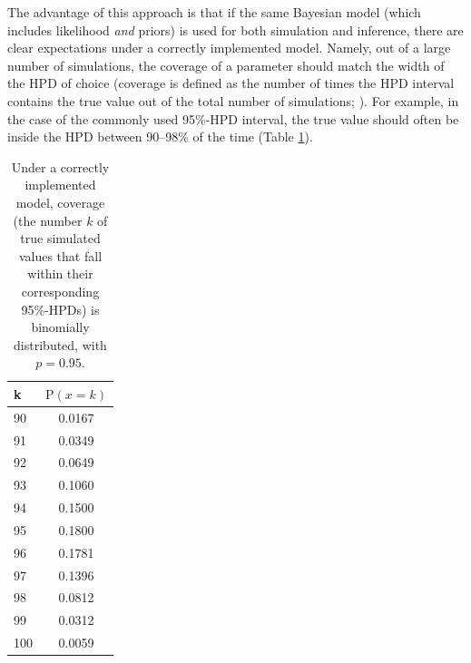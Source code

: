\documentclass[oneside]{article}
\begin{document}
The advantage of this approach is that if the same Bayesian model (which
includes likelihood \emph{and} priors) is used for both
simulation and inference, there are clear expectations under a
correctly implemented model.
Namely, out of a large number of simulations, the coverage of a
parameter should match the width of the HPD of choice
(coverage is defined as the number of times the HPD
interval contains the true value out of the total number of
simulations; \citealp{dawid82}).
For example, in the case of the commonly used 95\%-HPD interval, the true value
should often be inside the HPD between 90--98\% of the time (Table
\ref{tab:coverage}).

\begin{table}
\begin{center}
\begin{tabular}{lc}
\hline
k & $\text{P}(x=k)$ \\ %
\hline
90 & 0.0167 \\ %
91 & 0.0349 \\ %
92 & 0.0649 \\ %
93 & 0.1060 \\ %
94 & 0.1500 \\ %
95 & 0.1800 \\ %
96 & 0.1781 \\ %
97 & 0.1396 \\ %
98 & 0.0812 \\ %
99 & 0.0312 \\ %
100 & 0.0059 \\ %
\hline
\end{tabular}
\end{center}
\caption{Under a correctly implemented model, coverage (the number $k$
  of true simulated values that fall within their corresponding 95\%-HPDs) is binomially
  distributed, with $p=0.95$. 
\label{tab:coverage}}
\end{table}
\end{document}
